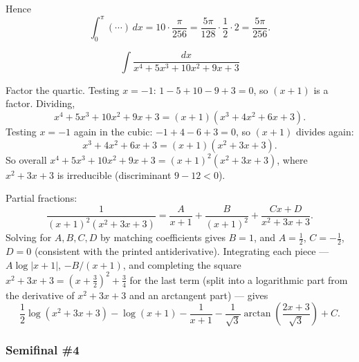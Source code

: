 \begin{questions}
\begin{solution}
Hence
\[
\int_0^\pi(\cdots)\,dx = 10\cdot\frac{\pi}{256}=\frac{5\pi}{128}\cdot\frac12\cdot2=\frac{5\pi}{256}.
\]
\end{solution}

\question
\[
\int \frac{dx}{x^{4}+5x^{3}+10x^{2}+9x+3}
\]
\begin{solution}
Factor the quartic. Testing $x=-1$: $1-5+10-9+3=0$, so $(x+1)$ is a factor. Dividing,
\[
x^4+5x^3+10x^2+9x+3=(x+1)(x^3+4x^2+6x+3).
\]
Testing $x=-1$ again in the cubic: $-1+4-6+3=0$, so $(x+1)$ divides again:
\[
x^3+4x^2+6x+3=(x+1)(x^2+3x+3).
\]
So overall $x^4+5x^3+10x^2+9x+3=(x+1)^2(x^2+3x+3)$, where $x^2+3x+3$ is irreducible (discriminant $9-12<0$).

Partial fractions:
\[
\frac{1}{(x+1)^2(x^2+3x+3)}=\frac{A}{x+1}+\frac{B}{(x+1)^2}+\frac{Cx+D}{x^2+3x+3}.
\]
Solving for $A,B,C,D$ by matching coefficients gives $B=1$, and $A=\tfrac12$, $C=-\tfrac12$, $D=0$ (consistent with the printed antiderivative). Integrating each piece — $A\log|x+1|$, $-B/(x+1)$, and completing the square $x^2+3x+3=\left(x+\tfrac32\right)^2+\tfrac34$ for the last term (split into a logarithmic part from the derivative of $x^2+3x+3$ and an arctangent part) — gives
\[
\frac12\log(x^2+3x+3)-\log(x+1)-\frac{1}{x+1}-\frac{1}{\sqrt3}\arctan\!\left(\frac{2x+3}{\sqrt3}\right)+C.
\]
\end{solution}

\end{questions}

\subsubsection*{Semifinal \#4}

